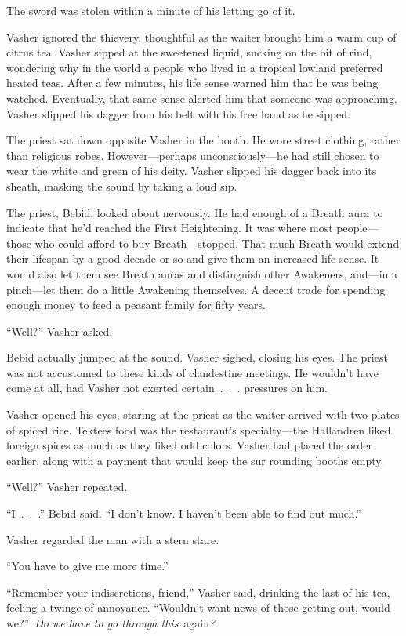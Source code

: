 The sword was stolen within a minute of his letting go of it.

Vasher ignored the thievery, thoughtful as the waiter brought him a warm cup of citrus tea. Vasher sipped at the sweetened liquid, sucking on the bit of rind, wondering why in the world a people who lived in a tropical lowland preferred heated teas. After a few minutes, his life sense warned him that he was being watched. Eventually, that same sense alerted him that someone was approaching. Vasher slipped his dagger from his belt with his free hand as he sipped.

The priest sat down opposite Vasher in the booth. He wore street clothing, rather than religious robes. However—perhaps unconsciously—he had still chosen to wear the white and green of his deity. Vasher slipped his dagger back into its sheath, masking the sound by taking a loud sip.

The priest, Bebid, looked about nervously. He had enough of a Breath aura to indicate that he’d reached the First Heightening. It was where most people—those who could afford to buy Breath—stopped. That much Breath would extend their lifespan by a good decade or so and give them an increased life sense. It would also let them see Breath auras and distinguish other Awakeners, and—in a pinch—let them do a little Awakening themselves. A decent trade for spending enough money to feed a peasant family for fifty years.

“Well?” Vasher asked.

Bebid actually jumped at the sound. Vasher sighed, closing his eyes. The priest was not accustomed to these kinds of clandestine meetings. He wouldn’t have come at all, had Vasher not exerted certain~.~.~. pressures on him.

Vasher opened his eyes, staring at the priest as the waiter arrived with two plates of spiced rice. Tektees food was the restaurant’s specialty—the Hallandren liked foreign spices as much as they liked odd colors. Vasher had placed the order earlier, along with a payment that would keep the sur rounding booths empty.

“Well?” Vasher repeated.

“I~.~.~.” Bebid said. “I don’t know. I haven’t been able to find out much.”

Vasher regarded the man with a stern stare.

“You have to give me more time.”

“Remember your indiscretions, friend,” Vasher said, drinking the last of his tea, feeling a twinge of annoyance. “Wouldn’t want news of those getting out, would we?”~\textit{Do we have to go through this}~again\textit{?}

